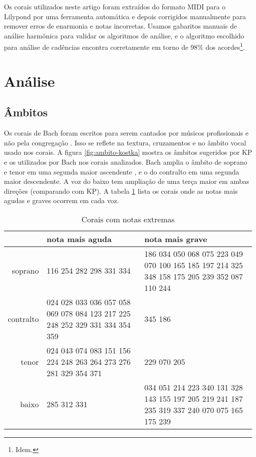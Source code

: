 Os corais utilizados neste artigo foram extraídos do formato MIDI para
o Lilypond por uma ferramenta automática e depois corrigidos
manualmente para remover erros de enarmonia e notas incorretas. Usamos
gabaritos manuais de análise harmônica para validar os algoritmos de
análise, e o algoritmo escolhido para análise de cadências encontra
corretamente em torno de 98\% dos acordes\footnote{Idem.}.

\section{Análise}
\label{sec:analise}

\subsection{Âmbitos}
\label{sec:ambitos}

Os corais de Bach foram escritos para serem cantados por músicos
profissionais e não pela congregação \cite{bach41:371} . Isso  se reflete na textura, cruzamentos e no âmbito vocal usado nos
corais. A figura \ref{fig:ambito-kostka} mostra os âmbitos sugeridos
por KP e os utilizados por Bach nos corais analizados. Bach amplia o
âmbito de soprano e tenor em uma segunda maior ascendente , e o
do contralto em uma segunda maior descendente. A voz do baixo tem
ampliação de uma terça maior em ambas direções (comparando com KP). A
tabela \ref{tab:notas-extremas} lista os corais onde as notas mais
agudas e graves ocorrem em cada voz.

\begin{table}[t]
\begin{center}
\begin{small}
\begin{sc}
  \begin{tabular}{r|p{4cm}p{4cm}}
    & nota mais aguda & nota mais grave \\ 
    \hline
    soprano &  116 254 282 298 331 334 &  186 034 050 068 075 223 049 070 100 165 185 197 214 325 348 158 175
    205 239 352 087 110 244 \\ \aroundspace
    contralto & 024 028 033 036 057 058 069 078 084 123 217 225 248 252 329 331 334
    354 359 &   345 186 \\ \aroundspace
    tenor &   024 043 074 083 151 156 224 248 263 264 273 276 281 329
    354 371 &   229 070 205 \\ \aroundspace
    baixo &   285 312 331 &   034 051 214 223 340 131 328 143 155 197 205 219 241 187 235 319 337
    240 070 075 165 175 239 
  \end{tabular}
  \caption{Corais com notas extremas}
  \label{tab:notas-extremas}
\end{sc}
\end{small}
\end{center}
\end{table}

